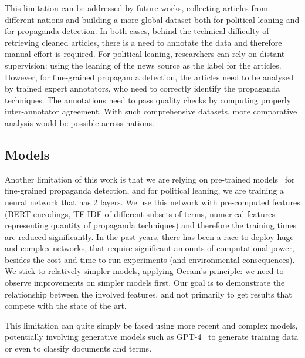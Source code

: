 This limitation can be addressed by future works, collecting articles from different nations and building a more global dataset both for political leaning and for propaganda detection. In both cases, behind the technical difficulty of retrieving cleaned articles, there is a need to annotate the data and therefore manual effort is required. For political leaning, researchers can rely on distant supervision: using the leaning of the news source as the label for the articles. However, for fine-grained propaganda detection, the articles need to be analysed by trained expert annotators, who need to correctly identify the propaganda techniques. The annotations need to pass quality checks by computing properly inter-annotator agreement. With such comprehensive datasets, more comparative analysis would be possible across nations.

\subsection{Models}
Another limitation of this work is that we are relying on pre-trained models~\citep{da2019fine} for fine-grained propaganda detection, and for political leaning, we are training a neural network that has 2 layers.
We use this network with pre-computed features (BERT encodings, TF-IDF of different subsets of terms, numerical features representing quantity of propaganda techniques) and therefore the training times are reduced significantly.
In the past years, there has been a race to deploy huge and complex networks, that require significant amounts of computational power, besides the cost and time to run experiments (and environmental consequences).
We stick to relatively simpler models, applying Occam's principle: we need to observe improvements on simpler models first.
Our goal is to demonstrate the relationship between the involved features, and not primarily to get results that compete with the state of the art.

This limitation can quite simply be faced using more recent and complex models, potentially involving generative models such as GPT-4~\citep{openai2023gpt4} to generate training data or even to classify documents and terms.




